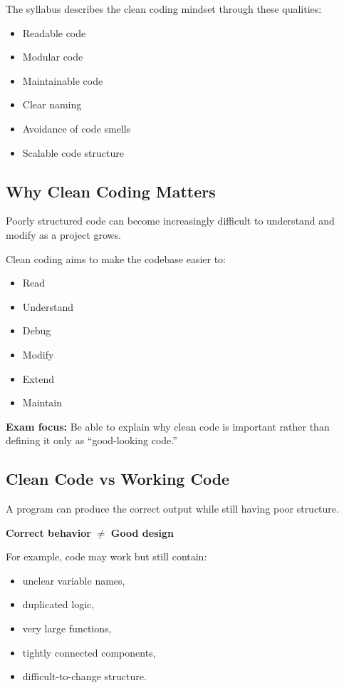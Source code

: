 \documentclass[11pt,a4paper]{article}
\begin{document}
The syllabus describes the clean coding mindset through these qualities:

\begin{itemize}
    \item Readable code
    \item Modular code
    \item Maintainable code
    \item Clear naming
    \item Avoidance of code smells
    \item Scalable code structure
\end{itemize}

\subsection{Why Clean Coding Matters}

Poorly structured code can become increasingly difficult to understand and modify
as a project grows.

Clean coding aims to make the codebase easier to:

\begin{itemize}
    \item Read
    \item Understand
    \item Debug
    \item Modify
    \item Extend
    \item Maintain
\end{itemize}

\begin{exambox}
\textbf{Exam focus:} Be able to explain why clean code is important rather than
defining it only as ``good-looking code.''
\end{exambox}

\subsection{Clean Code vs Working Code}

A program can produce the correct output while still having poor structure.

\begin{center}
\textbf{Correct behavior} $\neq$ \textbf{Good design}
\end{center}

For example, code may work but still contain:

\begin{itemize}
    \item unclear variable names,
    \item duplicated logic,
    \item very large functions,
    \item tightly connected components,
    \item difficult-to-change structure.
\end{itemize}
\end{document}
